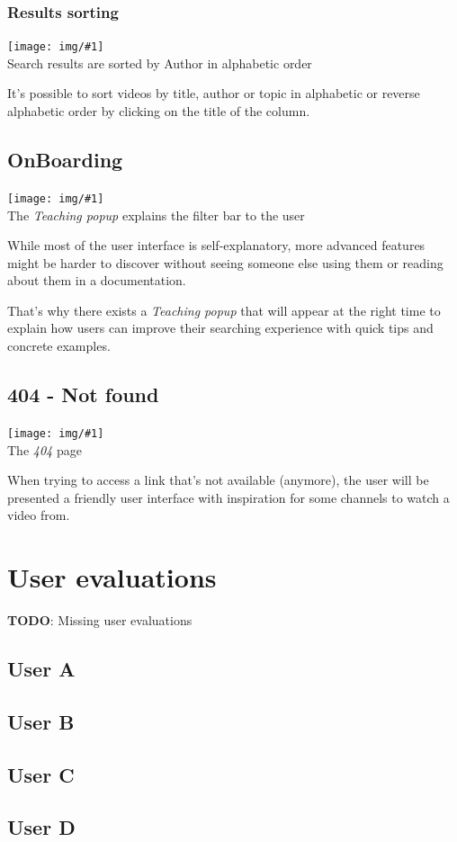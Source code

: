 \documentclass[12pt,numbers=enddot]{exam}
\newcommand{\todo}[1]{{
\color{red} \textbf{TODO}: {#1} \\
}}
\newcommand{\pic}[2]{{
\begin{center}
\texttt{[image: img/\#1]} \\
{#2}
\end{center}
}}
\begin{document}
\subsubsection{Results sorting}

\pic{se_sorting}{Search results are sorted by Author in alphabetic order}

It's possible to sort videos by title, author or topic in alphabetic 
or reverse alphabetic order by clicking on the title of the column.

\subsection{OnBoarding}

\pic{se_onboarding}{
The \textit{Teaching popup} explains the filter bar to the user
}

While most of the user interface is self-explanatory, more advanced features
might be harder to discover without seeing someone else using them or
reading about them in a documentation.

That's why there exists a \textit{Teaching popup} that will appear at the
right time to explain how users can improve their searching experience with
quick tips and concrete examples.

\subsection{404 - Not found}

\pic{se_fourzerofour}{The \textit{404} page}

When trying to access a link that's not available (anymore), the
user will be presented a friendly user interface with inspiration
for some channels to watch a video from.

\newpage

\section{User evaluations}

\todo{Missing user evaluations}

\subsection{User A}

\subsection{User B}

\subsection{User C}

\subsection{User D}
\end{document}
